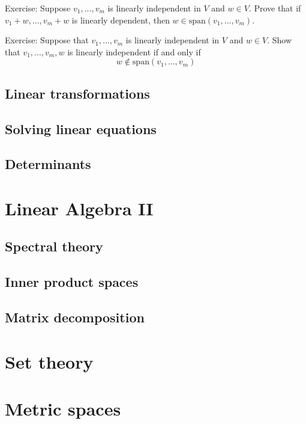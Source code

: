 \documentclass{article}
\begin{document}
Exercise: Suppose $v_{1},...,v_{m}$ is linearly independent in $V$
and $w\in V$. Prove that if $v_{1}+w,...,v_{m}+w$ is linearly dependent,
then $w\in\text{span}(v_{1},...,v_{m})$. 

Exercise: Suppose that $v_{1},...,v_{m}$ is linearly independent
in $V$ and $w\in V$. Show that $v_{1},...,v_{m},w$ is linearly
independent if and only if 
\[
w\notin\text{span}(v_{1},...,v_{m})
\]


\subsection{Linear transformations}

\subsection{Solving linear equations}

\subsection{Determinants}

\section{Linear Algebra II}

\subsection{Spectral theory}

\subsection{Inner product spaces}

\subsection{Matrix decomposition}

\section{Set theory}

\section{Metric spaces}
\end{document}
